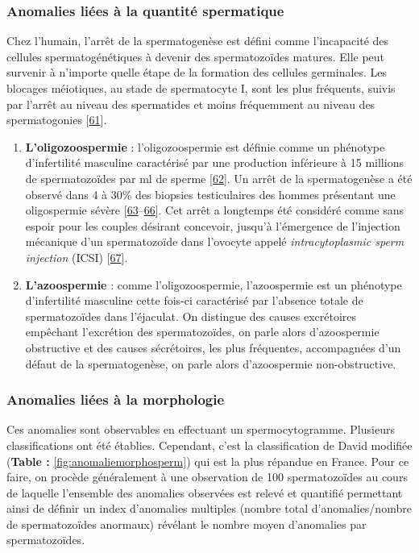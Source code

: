 \documentclass[12pt,a4paper,twoside]{ugathesis}
\theoremstyle{definition}
\theoremstyle{definition}
\theoremstyle{definition}
\theoremstyle{remark}
\begin{document}
\newpage

\subsubsection{Anomalies liées à la quantité
spermatique}\label{infquant}

Chez l'humain, l'arrêt de la spermatogenèse est défini comme
l'incapacité des cellules spermatogénétiques à devenir des
spermatozoïdes matures. Elle peut survenir à n'importe quelle étape de
la formation des cellules germinales. Les blocages méiotiques, au stade
de spermatocyte I, sont les plus fréquents, suivis par l'arrêt au niveau
des spermatides et moins fréquemment au niveau des spermatogonies
{[}\protect\hyperlink{ref-Girgis}{61}{]}.

\begin{enumerate}
\def\labelenumi{\arabic{enumi}.}
\item
  \textbf{L'oligozoospermie} : l'oligozoospermie est définie comme un
  phénotype d'infertilité masculine caractérisé par une production
  inférieure à 15 millions de spermatozoïdes par ml de sperme
  {[}\protect\hyperlink{ref-Cooper2010}{62}{]}. Un arrêt de la
  spermatogenèse a été observé dans 4 à 30\% des biopsies testiculaires
  des hommes présentant une oligospermie sévère
  {[}\protect\hyperlink{ref-Colgan1980}{63}--\protect\hyperlink{ref-WONG1973}{66}{]}.
  Cet arrêt a longtemps été considéré comme sans espoir pour les couples
  désirant concevoir, jusqu'à l'émergence de l'injection mécanique d'un
  spermatozoïde dans l'ovocyte appelé \emph{intracytoplasmic sperm
  injection} (ICSI) {[}\protect\hyperlink{ref-Palermo1992}{67}{]}.
\item
  \textbf{L'azoospermie} : comme l'oligozoospermie, l'azoospermie est un
  phénotype d'infertilité masculine cette fois-ci caractérisé par
  l'absence totale de spermatozoïdes dans l'éjaculat. On distingue des
  causes excrétoires empêchant l'excrétion des spermatozoïdes, on parle
  alors d'azoospermie obstructive et des causes sécrétoires, les plus
  fréquentes, accompagnées d'un défaut de la spermatogenèse, on parle
  alors d'azoospermie non-obstructive.
\end{enumerate}

\subsubsection{Anomalies liées à la
morphologie}\label{anomalies-liees-a-la-morphologie}

Ces anomalies sont observables en effectuant un spermocytogramme.
Plusieurs classifications ont été établies. Cependant, c'est la
classification de David modifiée (\textbf{Table :}
\ref{fig:anomaliemorphosperm}) qui est la plus répandue en France. Pour
ce faire, on procède généralement à une observation de 100
spermatozoïdes au cours de laquelle l'ensemble des anomalies observées
est relevé et quantifié permettant ainsi de définir un index d'anomalies
multiples (nombre total d'anomalies/nombre de spermatozoïdes anormaux)
révélant le nombre moyen d'anomalies par spermatozoïdes.
\end{document}
